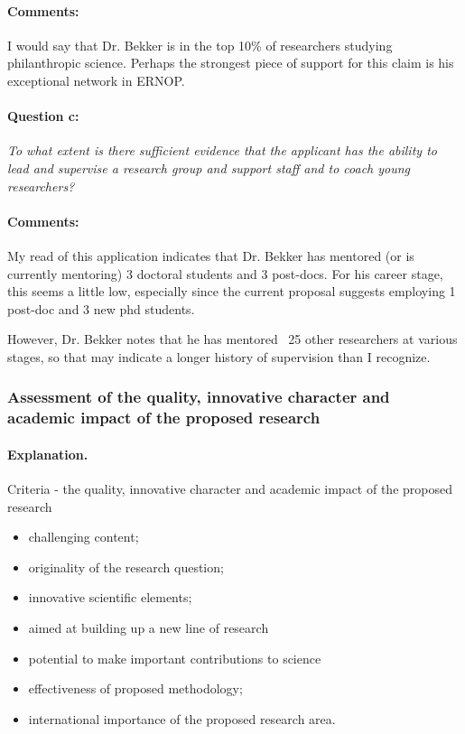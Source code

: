 \documentclass[twocolumn, serif, rga, numeric]{jote-article}
\begin{document}
\paragraph{Comments:}
I would say that Dr. Bekker is in the top 10\% of researchers studying philanthropic science. Perhaps the strongest piece of support for this claim is his exceptional network in ERNOP.
\paragraph{Question c:}
\textit{To what extent is there sufficient evidence that the applicant has the ability to lead and supervise a research group and support staff and to coach young researchers?}
\paragraph{Comments:}
My read of this application indicates that Dr. Bekker has mentored (or is currently mentoring) 3 doctoral students and 3 post-docs. For his career stage, this seems a little low, especially since the current proposal suggests employing 1 post-doc and 3 new phd students.

However, Dr. Bekker notes that he has mentored ~25 other researchers at various stages, so that may indicate a longer history of supervision than I recognize.
 {}\subsubsection*{Assessment of the quality, innovative character and academic impact of the proposed research} 
\paragraph{Explanation.}
Criteria - the quality, innovative character and academic impact of the proposed research 
\begin{itemize} 
\item challenging content; \item originality of the research question; \item innovative scientific elements; \item aimed at building up a new line of research\item potential to make important contributions to science\item effectiveness of proposed methodology; \item international importance of the proposed research area.
\end{itemize}
\end{document}
